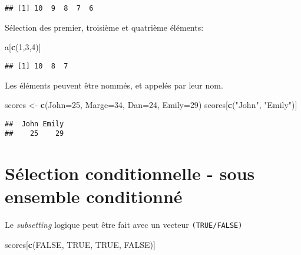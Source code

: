 \documentclass[]{book}
\newenvironment{Shaded}{\begin{snugshade}}{\end{snugshade}}
\newcommand{\DataTypeTok}[1]{\textcolor[rgb]{0.13,0.29,0.53}{#1}}
\newcommand{\DecValTok}[1]{\textcolor[rgb]{0.00,0.00,0.81}{#1}}
\newcommand{\KeywordTok}[1]{\textcolor[rgb]{0.13,0.29,0.53}{\textbf{#1}}}
\newcommand{\NormalTok}[1]{#1}
\newcommand{\OtherTok}[1]{\textcolor[rgb]{0.56,0.35,0.01}{#1}}
\newcommand{\StringTok}[1]{\textcolor[rgb]{0.31,0.60,0.02}{#1}}
\begin{document}
\begin{verbatim}
## [1] 10  9  8  7  6
\end{verbatim}

Sélection des premier, troisième et quatrième éléments:

\begin{Shaded}
\begin{Highlighting}[]
\NormalTok{a[}\KeywordTok{c}\NormalTok{(}\DecValTok{1}\NormalTok{,}\DecValTok{3}\NormalTok{,}\DecValTok{4}\NormalTok{)]}
\end{Highlighting}
\end{Shaded}

\begin{verbatim}
## [1] 10  8  7
\end{verbatim}

Les éléments peuvent être nommés, et appelés par leur nom.

\begin{Shaded}
\begin{Highlighting}[]
\NormalTok{scores <-}\StringTok{ }\KeywordTok{c}\NormalTok{(}\DataTypeTok{John=}\DecValTok{25}\NormalTok{, }\DataTypeTok{Marge=}\DecValTok{34}\NormalTok{, }\DataTypeTok{Dan=}\DecValTok{24}\NormalTok{, }\DataTypeTok{Emily=}\DecValTok{29}\NormalTok{)}
\NormalTok{scores[}\KeywordTok{c}\NormalTok{(}\StringTok{"John"}\NormalTok{, }\StringTok{"Emily"}\NormalTok{)]}
\end{Highlighting}
\end{Shaded}

\begin{verbatim}
##  John Emily 
##    25    29
\end{verbatim}

\hypertarget{selection-conditionnelle---sous-ensemble-conditionne}{%
\section{Sélection conditionnelle - sous ensemble conditionné}\label{selection-conditionnelle---sous-ensemble-conditionne}}

Le \emph{subsetting} logique peut être fait avec un vecteur \texttt{(TRUE/FALSE)}

\begin{Shaded}
\begin{Highlighting}[]
\NormalTok{scores[}\KeywordTok{c}\NormalTok{(}\OtherTok{FALSE}\NormalTok{, }\OtherTok{TRUE}\NormalTok{, }\OtherTok{TRUE}\NormalTok{, }\OtherTok{FALSE}\NormalTok{)]}
\end{Highlighting}
\end{Shaded}
\end{document}
